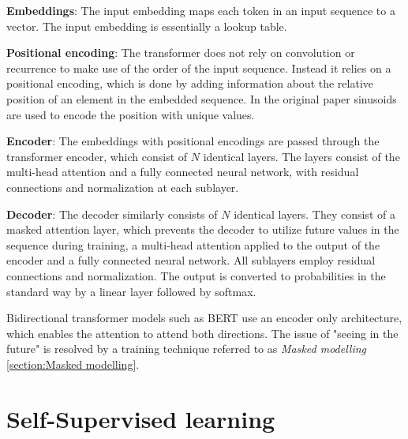 \documentclass[../../thesis.tex]{subfiles}
\begin{document}
\textbf{Embeddings}: The input embedding maps each token in an input sequence to a vector. The input embedding is essentially a lookup table. 
\newline

\textbf{Positional encoding}: The transformer does not rely on convolution or recurrence to make use of the order of the input sequence. Instead it relies on a positional encoding, which is done by adding information about the relative position of an element in the embedded sequence. In the original paper \cite{vaswani2023attention} sinusoids are used to encode the position with unique values. 
\newline

\textbf{Encoder}: The embeddings with positional encodings are passed through the transformer encoder, which consist of $N$ identical layers. The layers consist of the multi-head attention and a fully connected neural network, with residual connections and normalization at each sublayer. 
\newline

\textbf{Decoder}: The decoder similarly consists of $N$ identical layers. They consist of a masked attention layer, which prevents the decoder to utilize future values in the sequence during training, a multi-head attention applied to the output of the encoder and a fully connected neural network. All sublayers employ residual connections and normalization. The output is converted to probabilities in the standard way by a linear layer followed by softmax. 
\newline

Bidirectional transformer models such as BERT \cite{devlin2019bert} use an encoder only architecture, which enables the attention to attend both directions. The issue of "seeing in the future" is resolved by a training technique referred to as \textit{Masked modelling} \ref{section:Masked modelling}.

\section{Self-Supervised learning}
\end{document}
